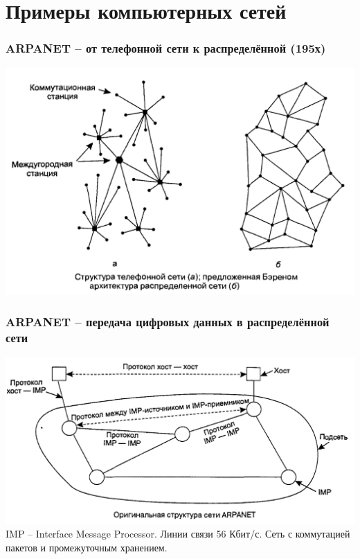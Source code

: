 \documentclass[utf8]{beamer}
\begin{document}
\section{Примеры компьютерных сетей}
\begin{frame}
\frametitle{ARPANET -- от телефонной сети к распределённой (195х)}
\includegraphics[width=\textwidth]{pic/arpanet.png}
\end{frame}
\begin{frame}
\frametitle{ARPANET -- передача цифровых данных в распределённой сети}
\includegraphics[width=\textwidth]{pic/arpanet-original.png}
\newline
IMP -- Interface Message Processor. Линии связи 56 Кбит/с. Сеть с коммутацией пакетов и промежуточным хранением.
\end{frame}
\end{document}
